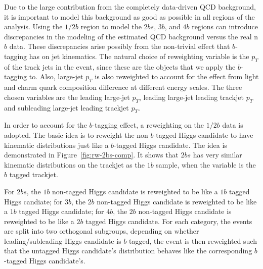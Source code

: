 Due to the large contribution from the completely data-driven QCD background, it is important to model this background as good as possible in all regions of the analysis. Using the $1/2b$ region to model the $2bs$, $3b$, and $4b$ regions can introduce discrepancies in the modeling of the estimated QCD background versus the real n$b$ data. These discrepancies arise possibly from the non-trivial effect that $b$-tagging has on jet kinematics. The natural choice of reweighting variable is the $p_{T}$ of the track jets in the event, since these are the objects that we apply the $b$-tagging to. Also, large-\R jet $p_{T}$ is also reweighted to account for the effect from light and charm quark composition difference at different energy scales. The three chosen variables are the leading large-\R jet $p_{T}$, leading large-\R jet leading trackjet $p_{T}$ and subleading large-\R jet leading trackjet $p_{T}$.

In order to account for the $b$-tagging effect, a reweighting on the $1/2b$ data is adopted. The basic idea is to reweight the non $b$-tagged Higgs candidate to have kinematic distributions just like a $b$-tagged Higgs candidate. The idea is demonstrated in Figure~\ref{fig:rw-2bs-comp}. It shows that $2bs$ has very similar kinematic distributions on the trackjet \pt as the $1b$ sample, when the variable is the $b$ tagged trackjet. 

For $2bs$, the $1b$ non-tagged Higgs candidate is reweighted to be like a $1b$ tagged Higgs candiate; for $3b$, the $2b$ non-tagged Higgs candidate is reweighted to be like a $1b$ tagged Higgs candidate; for $4b$, the $2b$ non-tagged Higgs candidate is reweighted to be like a $2b$ tagged Higgs candidate. For each category, the events are split into two orthogonal subgroups, depending on whether leading/subleading Higgs candidate is $b$-tagged, the event is then reweighted such that the untagged Higgs candidate's distribution behaves like the corresponding $b$-tagged Higgs candidate's.

